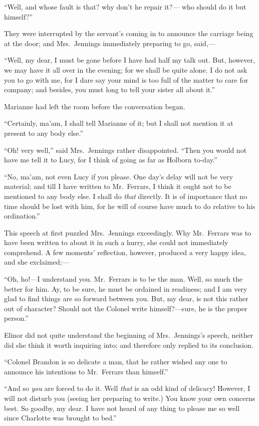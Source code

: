 \documentclass{article}
\begin{document}
``Well, and whose fault is that? why don't he repair it?---%
who should do it but himself?''

They were interrupted by the servant's coming in to
announce the carriage being at the door; and Mrs.\ Jennings
immediately preparing to go, said,---%

``Well, my dear, I must be gone before I have had half
my talk out.  But, however, we may have it all over in
the evening; for we shall be quite alone.  I do not ask
you to go with me, for I dare say your mind is too full
of the matter to care for company; and besides, you must
long to tell your sister all about it.''

Marianne had left the room before the conversation began.

``Certainly, ma'am, I shall tell Marianne of it;
but I shall not mention it at present to any body else.''

``Oh! very well,'' said Mrs.\ Jennings rather disappointed.
``Then you would not have me tell it to Lucy, for I think
of going as far as Holborn to-day.''

``No, ma'am, not even Lucy if you please.
One day's delay will not be very material; and till I
have written to Mr.\ Ferrars, I think it ought not to be
mentioned to any body else.  I shall do \emph{that} directly.
It is of importance that no time should be lost with him,
for he will of course have much to do relative to
his ordination.''

This speech at first puzzled Mrs.\ Jennings exceedingly.
Why Mr.\ Ferrars was to have been written to about it
in such a hurry, she could not immediately comprehend.
A few moments' reflection, however, produced a very happy idea,
and she exclaimed;---%

``Oh, ho!---I understand you.  Mr.\ Ferrars is to be
the man.  Well, so much the better for him.  Ay, to be sure,
he must be ordained in readiness; and I am very glad
to find things are so forward between you.  But, my dear,
is not this rather out of character?  Should not the Colonel
write himself?---sure, he is the proper person.''

Elinor did not quite understand the beginning of
Mrs.\ Jennings's speech, neither did she think it worth
inquiring into; and therefore only replied to its conclusion.

``Colonel Brandon is so delicate a man, that he rather
wished any one to announce his intentions to Mr.\ Ferrars
than himself.''

``And so \emph{you} are forced to do it.  Well \emph{that} is an odd
kind of delicacy!  However, I will not disturb you (seeing
her preparing to write.)  You know your own concerns best.
So goodby, my dear.  I have not heard of any thing to
please me so well since Charlotte was brought to bed.''
\end{document}
